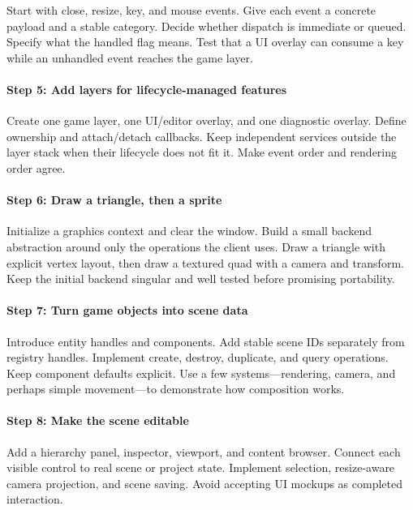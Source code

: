Start with close, resize, key, and mouse events. Give each event a concrete payload and a stable category. Decide whether dispatch is immediate or queued. Specify what the handled flag means. Test that a UI overlay can consume a key while an unhandled event reaches the game layer.

\paragraph{Step 5: Add layers for lifecycle-managed features}\label{step-5-add-layers-for-lifecycle-managed-features}

Create one game layer, one UI/editor overlay, and one diagnostic overlay. Define ownership and attach/detach callbacks. Keep independent services outside the layer stack when their lifecycle does not fit it. Make event order and rendering order agree.

\paragraph{Step 6: Draw a triangle, then a sprite}\label{step-6-draw-a-triangle-then-a-sprite}

Initialize a graphics context and clear the window. Build a small backend abstraction around only the operations the client uses. Draw a triangle with explicit vertex layout, then draw a textured quad with a camera and transform. Keep the initial backend singular and well tested before promising portability.

\paragraph{Step 7: Turn game objects into scene data}\label{step-7-turn-game-objects-into-scene-data}

Introduce entity handles and components. Add stable scene IDs separately from registry handles. Implement create, destroy, duplicate, and query operations. Keep component defaults explicit. Use a few systems---rendering, camera, and perhaps simple movement---to demonstrate how composition works.

\paragraph{Step 8: Make the scene editable}\label{step-8-make-the-scene-editable}

Add a hierarchy panel, inspector, viewport, and content browser. Connect each visible control to real scene or project state. Implement selection, resize-aware camera projection, and scene saving. Avoid accepting UI mockups as completed interaction.

